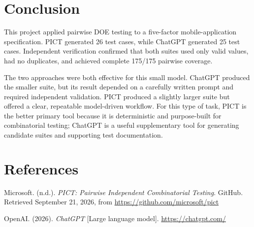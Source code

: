 \documentclass[11pt]{article}
\begin{document}
\section{Conclusion}

This project applied pairwise DOE testing to a five-factor mobile-application specification. PICT generated 26 test cases, while ChatGPT generated 25 test cases. Independent verification confirmed that both suites used only valid values, had no duplicates, and achieved complete 175/175 pairwise coverage.

The two approaches were both effective for this small model. ChatGPT produced the smaller suite, but its result depended on a carefully written prompt and required independent validation. PICT produced a slightly larger suite but offered a clear, repeatable model-driven workflow. For this type of task, PICT is the better primary tool because it is deterministic and purpose-built for combinatorial testing; ChatGPT is a useful supplementary tool for generating candidate suites and supporting test documentation.

\section*{References}

\hangindent=0.5in Microsoft. (n.d.). \textit{PICT: Pairwise Independent Combinatorial Testing}. GitHub. Retrieved September 21, 2026, from \url{https://github.com/microsoft/pict}

\hangindent=0.5in OpenAI. (2026). \textit{ChatGPT} [Large language model]. \url{https://chatgpt.com/}
\end{document}
